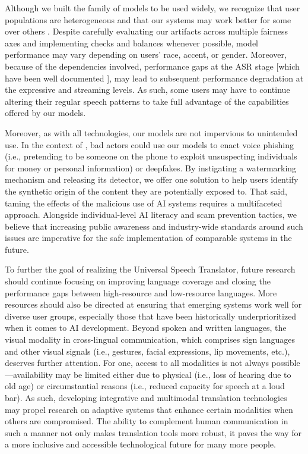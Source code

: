 Although we built the family of \seamless models to be used widely, we recognize that user populations are heterogeneous and that our systems may work better for some over others \citep{wang2023human}. Despite carefully evaluating our artifacts across multiple fairness axes and implementing checks and balances whenever possible, model performance may vary depending on users' race, accent, or gender. Moreover, because of the dependencies involved, performance gaps at the ASR stage [which have been well documented \citep{koenecke2020racial,ngueajio2022hey}], may lead to subsequent performance degradation at the expressive and streaming levels. As such, some users may have to continue altering their regular speech patterns to take full advantage of the capabilities offered by our models. 

Moreover, as with all technologies, our models are not impervious to unintended use. In the context of \seamless, bad actors could use our models to enact voice phishing (i.e., pretending to be someone on the phone to exploit unsuspecting individuals for money or personal information) or deepfakes. By instigating a watermarking mechanism and releasing its detector, we offer one solution to help users identify the synthetic origin of the content they are potentially exposed to. That said, taming the effects of the malicious use of AI systems requires a multifaceted approach. Alongside individual-level AI literacy and scam prevention tactics, we believe that increasing public awareness and industry-wide standards around such issues are imperative for the safe implementation of comparable systems in the future.

To further the goal of realizing the Universal Speech Translator, future research should continue focusing on improving language coverage and closing the performance gaps between high-resource and low-resource languages. More resources should also be directed at ensuring that emerging systems work well for diverse user groups, especially those that have been historically underprioritized when it comes to AI development. Beyond spoken and written languages, the visual modality in cross-lingual communication, which comprises sign languages and other visual signals (i.e., gestures, facial expressions, lip movements, etc.), deserves further attention. For one, access to all modalities is not always possible—availability may be limited either due to physical (i.e., loss of hearing due to old age) or circumstantial reasons (i.e., reduced capacity for speech at a loud bar). As such, developing integrative and multimodal translation technologies may propel research on adaptive systems that enhance certain modalities when others are compromised. The ability to complement human communication in such a manner not only makes translation tools more robust, it paves the way for a more inclusive and accessible technological future for many more people.